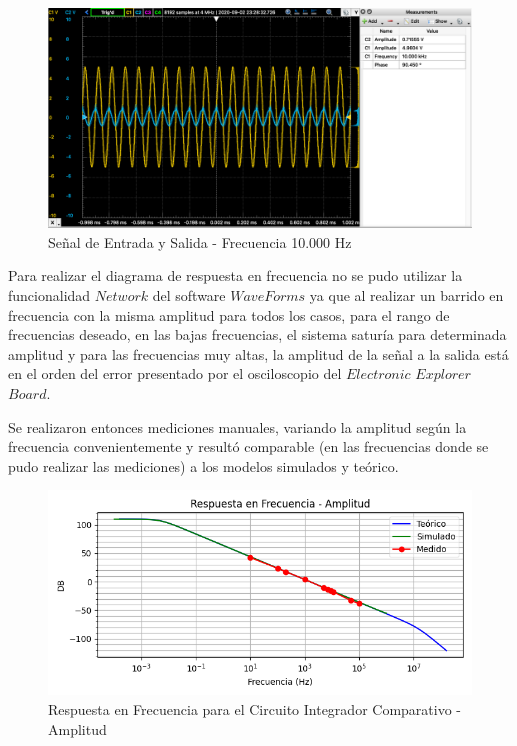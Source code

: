 \begin{figure}[H]
    \centering 
    \includegraphics [scale=0.4] {../Ejercicio3-CircuitoIntegradoresyDerivadores/Imagenes/senoidal - 10000.png} 
    \caption{Señal de Entrada y Salida - Frecuencia 10.000 Hz}
    \label{fig:emptyPlotTool}
\end{figure}

Para realizar el diagrama de respuesta en frecuencia no se pudo utilizar la funcionalidad $Network$ del software $WaveForms$ ya que al realizar un barrido en frecuencia
con la misma amplitud para todos los casos, para el rango de frecuencias deseado, en las bajas frecuencias, el sistema saturía para determinada amplitud y para las frecuencias muy altas, la amplitud de la señal a la salida
está en el orden del error presentado por el osciloscopio del $Electronic$ $Explorer$ $Board$.

Se realizaron entonces mediciones manuales, variando la amplitud según la frecuencia convenientemente y resultó comparable (en las frecuencias donde se pudo realizar las mediciones)
a los modelos simulados y teórico.

\begin{figure}[H]
    \centering 
    \includegraphics [scale=1] {../Ejercicio3-CircuitoIntegradoresyDerivadores/Imagenes/comparativo-integrador-amplitud.png} 
    \caption{Respuesta en Frecuencia para el Circuito Integrador Comparativo - Amplitud }
    \label{fig:emptyPlotTool}
\end{figure}


